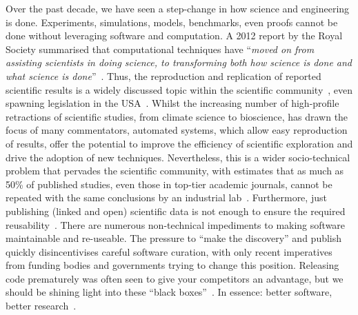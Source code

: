 \documentclass[conference]{IEEEtran}
\begin{document}
Over the past decade, we have seen a step-change in how science and
engineering is done. Experiments, simulations, models, benchmarks,
even proofs cannot be done without leveraging software and
computation. A 2012 report by the Royal Society summarised that
computational techniques have ``{\emph{moved on from assisting
scientists in doing science, to transforming both how science is done
and what science is done}}''~\cite{rssaaoe:2012}. Thus, the
reproduction and replication of reported scientific results is a
widely discussed topic within the scientific
community~\cite{schwab-et-al:2000,barnes:2010,mesirov:2010,morin-et-al:2012,joppa-et-al:2013},
even spawning legislation in the USA~\cite{hr4012:2014}.
Whilst the increasing number of high-profile retractions of scientific
studies, from climate science to bioscience, has drawn the focus of
many commentators, automated systems, which allow easy reproduction of
results, offer the potential to improve the efficiency of scientific
exploration and drive the adoption of new techniques. Nevertheless,
this is a wider socio-technical problem that pervades the scientific
community, with estimates that as much as 50\% of published studies,
even those in top-tier academic journals, cannot be repeated with the
same conclusions by an industrial
lab~\cite{osherovich:2011}. Furthermore, just publishing (linked and
open) scientific data is not enough to ensure the required
reusability~\cite{bechhofer-et-al:2013}. There are numerous
non-technical impediments to making software maintainable and
re-useable. The pressure to ``make the discovery'' and publish quickly
disincentivises careful software curation, with only recent
imperatives from funding bodies and governments trying to change this
position. Releasing code prematurely was often seen to give your
competitors an advantage, but we should be shining light into these
``black boxes''~\cite{morin-et-al:2012}. In essence: better software,
better research~\cite{goble:2014}.
\end{document}
